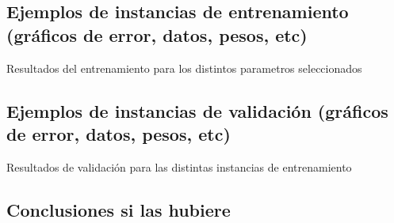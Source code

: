 \subsection{Ejemplos de instancias de entrenamiento (gráficos de error, datos, pesos, etc)}

\par Resultados del entrenamiento para los distintos parametros seleccionados

\subsection{Ejemplos de instancias de validación (gráficos de error, datos, pesos, etc)}

\par Resultados de validación para las distintas instancias de entrenamiento

\subsection{Conclusiones si las hubiere}